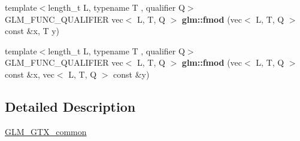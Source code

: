\begin{DoxyCompactItemize}
\item 
\mbox{\label{common_8inl_a1161c55eb5a2058970a6cc7814e43d40}} 
{\footnotesize template$<$length\+\_\+t L, typename T , qualifier Q$>$ }\\G\+L\+M\+\_\+\+F\+U\+N\+C\+\_\+\+Q\+U\+A\+L\+I\+F\+I\+ER vec$<$ L, T, Q $>$ {\bfseries glm\+::fmod} (vec$<$ L, T, Q $>$ const \&x, T y)
\item 
\mbox{\label{common_8inl_ad9141e6a2a35fc3752fa581605f3dac2}} 
{\footnotesize template$<$length\+\_\+t L, typename T , qualifier Q$>$ }\\G\+L\+M\+\_\+\+F\+U\+N\+C\+\_\+\+Q\+U\+A\+L\+I\+F\+I\+ER vec$<$ L, T, Q $>$ {\bfseries glm\+::fmod} (vec$<$ L, T, Q $>$ const \&x, vec$<$ L, T, Q $>$ const \&y)
\end{DoxyCompactItemize}


\subsection{Detailed Description}
\hyperlink{group__gtx__common}{G\+L\+M\+\_\+\+G\+T\+X\+\_\+common} 